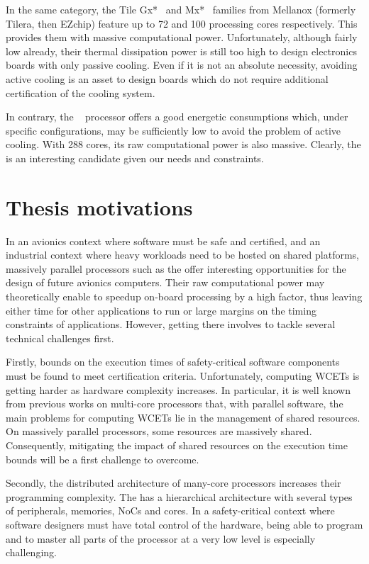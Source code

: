 \documentclass[main.tex]{subfiles}
\begin{document}
In the same category, the Tile Gx*~\cite{TileGx} and Mx*~\cite{TileMx} families
from Mellanox (formerly Tilera, then EZchip) feature up to 72 and 100
processing cores respectively. This provides them with massive computational
power. Unfortunately, although fairly low already, their thermal dissipation
power is still too high to design electronics boards with only passive cooling.
Even if it is not an absolute necessity, avoiding active cooling is an asset to
design boards which do not require additional certification of the cooling
system.

In contrary, the \mppalong~\cite{kalray_mppa} processor offers a good energetic
consumptions which, under specific configurations, may be sufficiently low to
avoid the problem of active cooling. With 288 cores, its raw computational
power is also massive. Clearly, the \mppalong is an interesting candidate given
our needs and constraints.


\section{Thesis motivations}
In an avionics context where software must be safe and certified, and an
industrial context where heavy workloads need to be hosted on shared platforms,
massively parallel processors such as the \mppalong offer interesting
opportunities for the design of future avionics computers. Their raw
computational power may theoretically enable to speedup on-board processing by
a high factor, thus leaving either time for other applications to run or large
margins on the timing constraints of applications. However, getting there
involves to tackle several technical challenges first.


Firstly, bounds on the execution times of safety-critical software components
must be found to meet certification criteria. Unfortunately, computing WCETs is
getting harder as hardware complexity increases. In particular, it is well
known from previous works on multi-core processors that, with parallel
software, the main problems for computing WCETs lie in the management of shared
resources. On massively parallel processors, some resources are massively
shared. Consequently, mitigating the impact of shared resources on the
execution time bounds will be a first challenge to overcome.

Secondly, the distributed architecture of many-core processors increases their
programming complexity. The \mppalong has a hierarchical architecture with
several types of peripherals, memories, NoCs and cores. In a safety-critical
context where software designers must have total control of the hardware, being
able to program and to master all parts of the processor at a very low level is
especially challenging.
\end{document}
